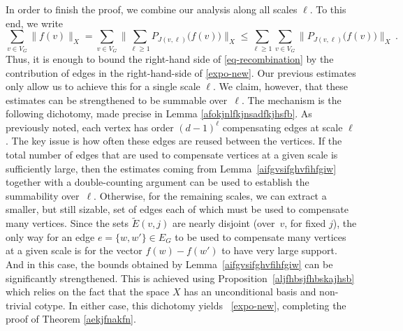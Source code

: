 \documentclass[11pt,leqno]{amsart}
\theoremstyle{remark}
\newtheorem{remark}[theorem]{Remark}
\theoremstyle{plain}
\begin{document}
In order to finish the proof, we combine our analysis along all scales $\ell$. To this end, we write
\begin{equation} \label{eq-recombination}
\sum_{v \in V_G} \|f(v)\|_X =
\sum_{v \in V_G} \Big\|\sum_{\ell\geqslant 1} P_{J(v,\ell)}\big(f(v)\big)\Big\|_X
\leqslant \sum_{\ell\geqslant 1} \sum_{v \in V_G}  \big\| P_{J(v,\ell)}\big(f(v)\big)\big\|_X\,.
\end{equation}
Thus, it is enough to bound the right-hand side of \eqref{eq-recombination} by the
contribution of edges in the right-hand-side of \eqref{expo-new}. Our previous estimates only allow us
to achieve this for a single scale $\ell$. We claim, however, that these estimates can be strengthened
to be summable over~$\ell$. The mechanism is the following dichotomy, made precise in Lemma \ref{afokjnlfkjnsadfkjhsfb}.
As previously noted, each vertex has order $(d-1)^\ell$ compensating edges at scale $\ell$.
The key issue is how often these edges are reused between the vertices.
If the total number of edges that are used to compensate vertices at a given scale is sufficiently large, then
the estimates coming from Lemma~\ref{aifgvsifghvfihfgiw} together with a double-counting argument can be used
to establish the summability over~$\ell$. Otherwise, for the remaining scales, we can extract a smaller, but still sizable, set of edges each of which must be used to
compensate many vertices. Since the sets $\tilde E(v,j)$ are nearly disjoint (over~$v$, for fixed $j$),
the only way for an edge $e=\{w,w'\}\in E_G$ to be used to compensate many vertices at a given scale is for the vector $f(w)-f(w')$ to have very large support. And in this case, the bounds
obtained by Lemma~\ref{aifgvsifghvfihfgiw} can be significantly strengthened. This is achieved
using Proposition~\ref{aljfhbsjfhbskajhsb} which relies on the fact that the space $X$ has an unconditional
basis and non-trivial cotype. In either case, this dichotomy yields ~\eqref{expo-new}, completing the proof of Theorem \ref{aekjfnakfn}.

\end{document}
